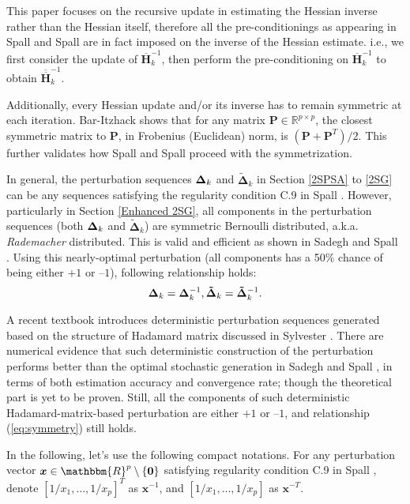 \documentclass[conference]{IEEEtran} \ifCLASSINFOpdf
\newcommand{\oH}{\bm{\overline{H}}}
\newcommand{\ooH}{\bm{\overline{\overline{H}}}}
\newcommand{\tDelta}{\bm{\tilde{\Delta}}}
\begin{document}
This paper focuses on the recursive update in estimating the
Hessian inverse rather than the Hessian itself, therefore all the
pre-conditionings as appearing in Spall \cite{Spall2000} and Spall
\cite{Spall2009} are in fact imposed on the inverse of the Hessian
estimate. i.e., we first consider the update of $ \oH_k^{-1} $, then
perform the pre-conditioning on $ \oH_k^{-1} $ to obtain $ \ooH_k^{-1} $.

Additionally, every Hessian update and/or its inverse has to
remain symmetric at each iteration. Bar-Itzhack \cite{Bar-Itzhack1998}
shows that for any matrix $ \bm{P}\in\mathbb{R}^{p\times p} $, the
closest symmetric matrix to $ \bm{P} $, in Frobenius (Euclidean) norm,
is $ (\bm{P}+\bm{P}^T)/2 $. This further validates how Spall
\cite{Spall2000} and Spall \cite{Spall2009} proceed with the
symmetrization.

In general, the perturbation sequences $\bm{\Delta}_k$ and
$\tDelta_k$ in Section \ref{2SPSA} to \ref{2SG} can be any sequences
satisfying the regularity condition C.9 in Spall
\cite{Spall2009}. However, particularly in Section \ref{Enhanced 2SG},
all components in the perturbation sequences (both $ \bm{\Delta}_k $ and
$\tDelta_k $) are symmetric Bernoulli distributed,
a.k.a. \textit{Rademacher} distributed. This is valid and efficient as
shown in Sadegh and Spall \cite{Sadegh1998}. Using this nearly-optimal
perturbation (all components has a 50\% chance of being either $+1$ or
$\text{--}1$), following relationship holds:
\begin{equation} \label{eq:symmetry}
\bDelta_k=\bDelta_k^{-1}, \tDelta_k=\tDelta_k^{-1}.
\end{equation}

A recent textbook \cite{Bhatnagar2012} introduces
deterministic perturbation sequences generated based on the structure
of Hadamard matrix discussed in Sylvester \cite{Sylvester1867}. There
are numerical evidence that such deterministic construction of the
perturbation performs better than the optimal stochastic generation in
Sadegh and Spall \cite{Sadegh1998}, in terms of both estimation
accuracy and convergence rate; though the theoretical part is yet to
be proven. Still, all the components of such deterministic
Hadamard-matrix-based perturbation are either $+1$ or $\text{--}1$,
and relationship (\ref{eq:symmetry}) still holds.

In the following, let's use the following compact
notations. For any perturbation vector
$ \bm{x}\in \mathbbm{R}^p \setminus \{\bm{0}\} $
satisfying regularity condition C.9 in Spall
\cite{Spall2009}, denote $ [1/x_1, ..., 1/x_p]^T $ as $ \bm{x}^{-1} $,
and $ [1/x_1, ..., 1/x_p] $ as $ \bm{x}^{-T} $.
\end{document}
